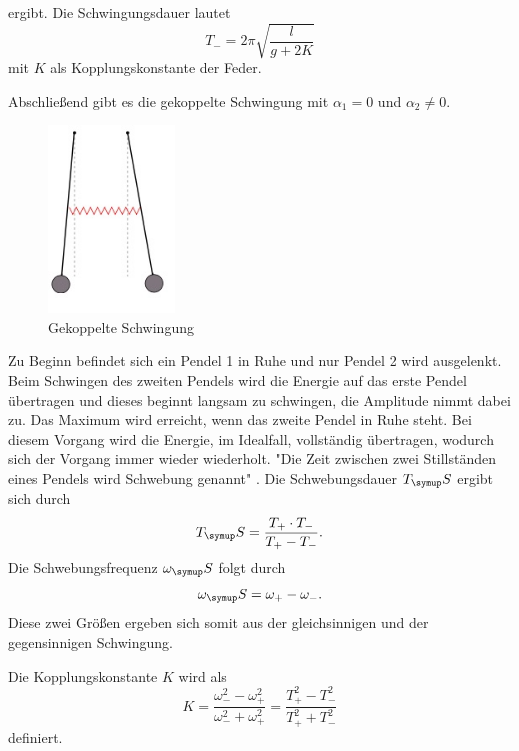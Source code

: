 ergibt. Die Schwingungsdauer lautet
\begin{equation}
  T_-= 2\pi\sqrt{\frac{l}{g+2K}}
  \label{eqn:T-}
\end{equation}
mit $K$ als Kopplungskonstante der Feder.
\par
Abschließend gibt es die gekoppelte Schwingung mit $\alpha_1 = 0$ und $\alpha_2 ≠ 0$.
\begin{figure}
  \centering
  \includegraphics[width= 0.3\textwidth]{bilder/gekoppelte.jpg}
  \caption{Gekoppelte Schwingung\,\cite{106}}
\end{figure}
Zu Beginn befindet sich ein Pendel 1 in Ruhe und nur Pendel 2 wird ausgelenkt.
Beim Schwingen des zweiten Pendels wird die Energie auf das erste Pendel übertragen
und dieses beginnt langsam zu schwingen, die Amplitude nimmt dabei zu. Das Maximum wird
erreicht, wenn das zweite Pendel in Ruhe steht. Bei diesem Vorgang wird die Energie,
im Idealfall, vollständig übertragen, wodurch sich der Vorgang immer wieder wiederholt.
"Die Zeit zwischen zwei Stillständen eines Pendels wird Schwebung genannt" \cite{106}.
Die Schwebungsdauer $T_\su{S}$ ergibt sich durch
\begin{equation}
  T_\su{S} = \frac{T_+ \cdot T_-}{T_+ - T_-}
  \label{eqn:Ts}.
\end{equation}
Die Schwebungsfrequenz $\omega_\su{S}$ folgt durch
\begin{equation}
  \omega_\su{S} = \omega_+ - \omega_-  .
  \label{eqn:ws}
\end{equation}
Diese zwei Größen ergeben sich somit aus der gleichsinnigen und der gegensinnigen
Schwingung.

Die Kopplungskonstante $K$ wird als
\begin{equation}
  K = \frac{\omega_-^2 - \omega_+^2}{\omega_-^2 + \omega_+^2} = \frac{T_+^2 - T_-^2}{T_+^2 + T_-^2}
  \label{eqn:K}
\end{equation}
definiert.
